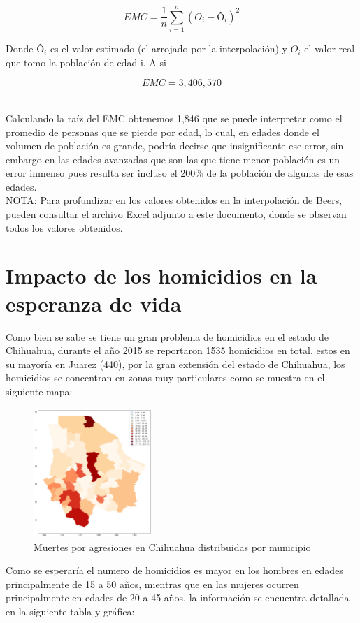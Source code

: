 \documentclass[fontsize=11pt]{article}
\begin{document}
$$EMC=\frac{1}{n} \sum_{i=1}^n (O_{i}-Ô_{i})^2$$

Donde $Ô_i$ es el valor estimado (el arrojado por la interpolación) y $O_{i}$ el valor real que tomo la población de edad i. A si 

$$EMC=3,406,570$$

\\Calculando la raíz del EMC obtenemos 1,846 que se puede interpretar como el promedio de personas que se pierde por edad, lo cual, en edades donde el volumen de población es grande, podría decirse que insignificante ese error, sin embargo en las edades avanzadas que son las que tiene menor población es un error inmenso pues resulta ser incluso el 200\% de la población de algunas de esas edades. 
\\NOTA: Para profundizar en los valores obtenidos en la interpolación de Beers, pueden consultar el archivo Excel adjunto a este documento, donde se observan todos los valores obtenidos.


\section*{Impacto de los homicidios en la esperanza de vida}
Como bien se sabe se tiene un gran problema de homicidios en el estado de Chihuahua, durante el año 2015 se reportaron\cite{DAT} 1535 homicidios en total, estos en su mayoría en Juarez (440), por la gran extensión del estado de Chihuahua, los homicidios se concentran en zonas muy particulares como se muestra en el siguiente mapa: 
\begin{figure}[H]
\centering
\includegraphics[width=0.4\textwidth]{map}
\caption{Muertes por agresiones en Chihuahua distribuidas por municipio}
\end{figure}
Como se esperaría el numero de homicidios es mayor en los hombres en edades principalmente de 15 a 50 años, mientras que en las mujeres ocurren principalmente en edades de 20 a 45 años, la información se encuentra detallada en la siguiente tabla y gráfica: 
\end{document}
